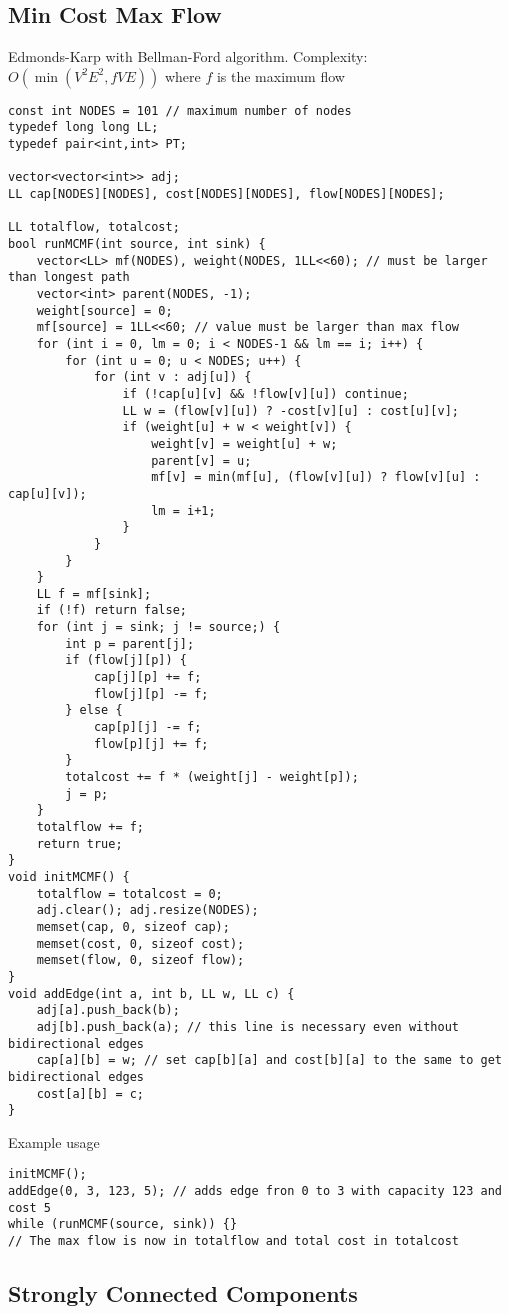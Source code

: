 \documentclass[letterpaper]{article}
\begin{document}
\subsection{Min Cost Max Flow}

Edmonds-Karp with Bellman-Ford algorithm. Complexity: $O\left(\min\left(V^2E^2, fVE\right)\right)$ where $f$ is the maximum flow

\begin{lstlisting}
const int NODES = 101 // maximum number of nodes
typedef long long LL;
typedef pair<int,int> PT;

vector<vector<int>> adj;
LL cap[NODES][NODES], cost[NODES][NODES], flow[NODES][NODES];

LL totalflow, totalcost;
bool runMCMF(int source, int sink) {
	vector<LL> mf(NODES), weight(NODES, 1LL<<60); // must be larger than longest path
	vector<int> parent(NODES, -1);
	weight[source] = 0;
	mf[source] = 1LL<<60; // value must be larger than max flow
	for (int i = 0, lm = 0; i < NODES-1 && lm == i; i++) {
		for (int u = 0; u < NODES; u++) {
			for (int v : adj[u]) {
				if (!cap[u][v] && !flow[v][u]) continue;
				LL w = (flow[v][u]) ? -cost[v][u] : cost[u][v];
				if (weight[u] + w < weight[v]) {
					weight[v] = weight[u] + w;
					parent[v] = u;
					mf[v] = min(mf[u], (flow[v][u]) ? flow[v][u] : cap[u][v]);
					lm = i+1;
				}
			}
		}
	}
	LL f = mf[sink];
	if (!f) return false;
	for (int j = sink; j != source;) {
		int p = parent[j];
		if (flow[j][p]) {
			cap[j][p] += f;
			flow[j][p] -= f;
		} else {
			cap[p][j] -= f;
			flow[p][j] += f;
		}
		totalcost += f * (weight[j] - weight[p]);
		j = p;
	}
	totalflow += f;
	return true;
}
void initMCMF() {
	totalflow = totalcost = 0;
	adj.clear(); adj.resize(NODES);
	memset(cap, 0, sizeof cap);
	memset(cost, 0, sizeof cost);
	memset(flow, 0, sizeof flow);
}
void addEdge(int a, int b, LL w, LL c) {
	adj[a].push_back(b);
	adj[b].push_back(a); // this line is necessary even without bidirectional edges
	cap[a][b] = w; // set cap[b][a] and cost[b][a] to the same to get bidirectional edges
	cost[a][b] = c;
}
\end{lstlisting}
Example usage
\begin{lstlisting}
initMCMF();
addEdge(0, 3, 123, 5); // adds edge fron 0 to 3 with capacity 123 and cost 5
while (runMCMF(source, sink)) {}
// The max flow is now in totalflow and total cost in totalcost
\end{lstlisting}

\clearpage

\subsection{Strongly Connected Components}
\end{document}
